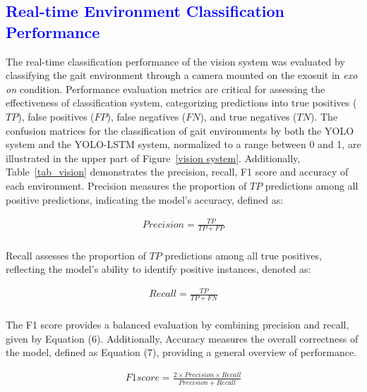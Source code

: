 \documentclass[journal,article,submit,pdftex,moreauthors]{Definitions/mdpi}
\begin{document}
\subsection{\textcolor{blue}{Real-time Environment Classification Performance}}
The real-time classification performance of the vision system was evaluated by classifying the gait environment through a camera mounted on the exosuit in \textit{exo on} condition. Performance evaluation metrics are critical for assessing the effectiveness of classification system, categorizing predictions into true positives ($TP$), false positives ($FP$), false negatives ($FN$), and true negatives ($TN$). The confusion matrices for the classification of gait environments by both the YOLO system and the YOLO-LSTM system, normalized to a range between 0 and 1, are illustrated in the upper part of Figure~\ref{vision system}. Additionally, Table~\ref{tab_vision} demonstrates the precision, recall, F1 score and accuracy of each environment. 
Precision measures the proportion of $TP$ predictions among all positive predictions, indicating the model's accuracy, defined as:
\begin{linenomath}
\begin{equation}
\begin{aligned}
\text{$Precision = \frac{TP}{TP+FP}$} \\
\end{aligned}
\end{equation}
\end{linenomath}
Recall assesses the proportion of $TP$ predictions among all true positives, reflecting the model's ability to identify positive instances, denoted as:
\begin{linenomath}
\begin{equation}
\begin{aligned}
\text{$Recall = \frac{TP}{TP+FN}$} \\
\end{aligned}
\end{equation}
\end{linenomath}
The F1 score provides a balanced evaluation by combining precision and recall, given by Equation (6). 
Additionally, Accuracy measures the overall correctness of the model, defined as Equation (7), providing a general overview of performance. 
\begin{linenomath}
\begin{equation}
\begin{aligned}
\text{$F1score = \frac{2\times Precision \times Recall}{Precision+Recall}$}
\end{aligned}
\end{equation}
\end{linenomath}
\end{document}

